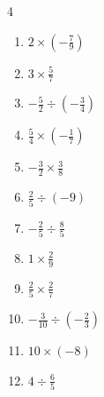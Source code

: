 \begin{multicols}{4}
\begin{enumerate}
  \item $\displaystyle 2\times{}\left(-\frac{7}{9}\right)$


  \item $\displaystyle 3\times{}\frac{5}{7}$


  \item $\displaystyle -\frac{5}{2}\div{}\left(-\frac{3}{4}\right)$


\columnbreak %

  \item $\displaystyle \frac{5}{4}\times{}\left(-\frac{1}{7}\right)$


  \item $\displaystyle -\frac{3}{2}\times{}\frac{3}{8}$


  \item $\displaystyle \frac{2}{5}\div{}\left(-9\right)$


  \item $\displaystyle -\frac{2}{5}\div{}\frac{8}{5}$


  \item $\displaystyle 1\times{}\frac{2}{9}$


  \item $\displaystyle \frac{2}{5}\times{}\frac{2}{7}$


  \item $\displaystyle -\frac{3}{10}\div{}\left(-\frac{2}{3}\right)$


  \item $\displaystyle 10\times{}\left(-8\right)$

        \phantom{$\displaystyle =-80$}

  \item $\displaystyle 4\div{}\frac{6}{5}$


\end{enumerate}
\end{multicols}
